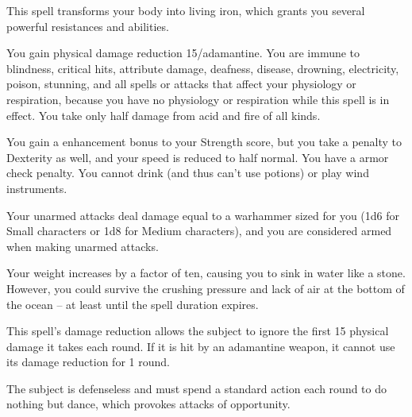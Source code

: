 \spellrng{\rngpers}
\begin{spelleffect}
  This spell transforms your body into living iron, which grants you several powerful resistances and abilities.
  \par You gain physical damage reduction 15/adamantine. You are immune to blindness, critical hits, attribute damage, deafness, disease, drowning, electricity, poison, stunning, and all spells or attacks that affect your physiology or respiration, because you have no physiology or respiration while this spell is in effect. You take only half damage from acid and fire of all kinds.
  \par You gain a  enhancement bonus to your Strength score, but you take a  penalty to Dexterity as well, and your speed is reduced to half normal. You have a  armor check penalty. You cannot drink (and thus can't use potions) or play wind instruments.
  \par Your unarmed attacks deal damage equal to a warhammer sized for you (1d6 for Small characters or 1d8 for Medium characters), and you are considered armed when making unarmed attacks.
  \par Your weight increases by a factor of ten, causing you to sink in water like a stone. However, you could survive the crushing pressure and lack of air at the bottom of the ocean -- at least until the spell duration expires.
\end{spelleffect}
\begin{spellnotes}
  This spell's damage reduction allows the subject to ignore the first 15 physical damage it takes each round. If it is hit by an adamantine weapon, it cannot use its damage reduction for 1 round.
\end{spellnotes}

\spellrng{\rngclose}
\begin{spelleffect}
  The subject is defenseless and must spend a standard action each round to do nothing but dance, which provokes attacks of opportunity.
\end{spelleffect}

